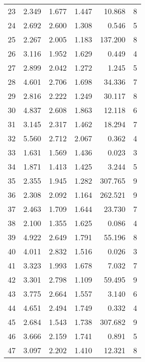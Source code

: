 \begin{tabular}{lrrrrr}
23  &     2.349 &      1.677 &      1.447 &   10.868 &        8 \\
24  &     2.692 &      2.600 &      1.308 &    0.546 &        5 \\
25  &     2.267 &      2.005 &      1.183 &  137.200 &        8 \\
26  &     3.116 &      1.952 &      1.629 &    0.449 &        4 \\
27  &     2.899 &      2.042 &      1.272 &    1.245 &        5 \\
28  &     4.601 &      2.706 &      1.698 &   34.336 &        7 \\
29  &     2.816 &      2.222 &      1.249 &   30.117 &        8 \\
30  &     4.837 &      2.608 &      1.863 &   12.118 &        6 \\
31  &     3.145 &      2.317 &      1.462 &   18.294 &        7 \\
32  &     5.560 &      2.712 &      2.067 &    0.362 &        4 \\
33  &     1.631 &      1.569 &      1.436 &    0.023 &        3 \\
34  &     1.871 &      1.413 &      1.425 &    3.244 &        5 \\
35  &     2.355 &      1.945 &      1.282 &  307.765 &        9 \\
36  &     2.308 &      2.092 &      1.164 &  262.521 &        9 \\
37  &     2.463 &      1.709 &      1.644 &   23.730 &        7 \\
38  &     2.100 &      1.355 &      1.625 &    0.086 &        4 \\
39  &     4.922 &      2.649 &      1.791 &   55.196 &        8 \\
40  &     4.011 &      2.832 &      1.516 &    0.026 &        3 \\
41  &     3.323 &      1.993 &      1.678 &    7.032 &        7 \\
42  &     3.301 &      2.798 &      1.109 &   59.495 &        9 \\
43  &     3.775 &      2.664 &      1.557 &    3.140 &        6 \\
44  &     4.651 &      2.494 &      1.749 &    0.332 &        4 \\
45  &     2.684 &      1.543 &      1.738 &  307.682 &        9 \\
46  &     3.666 &      2.159 &      1.741 &    0.891 &        5 \\
47  &     3.097 &      2.202 &      1.410 &   12.321 &        8 \\

\end{tabular}

